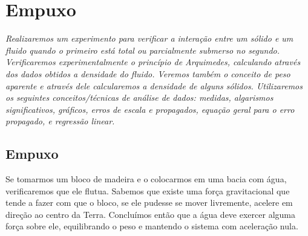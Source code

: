 \chapter{Empuxo} %
\label{Chap:ExpEmpuxo}        %

\begin{fullwidth}\it
	Realizaremos um experimento para verificar a interação entre um sólido e um fluido quando o primeiro está total ou parcialmente submerso no segundo. Verificaremos experimentalmente o princípio de Arquimedes, calculando através dos dados obtidos a densidade do fluido. Veremos também o conceito de peso aparente e através dele calcularemos a densidade de alguns sólidos. Utilizaremos os seguintes conceitos/técnicas de análise de dados: medidas, algarismos significativos, gráficos, erros de escala e propagados, equação geral para o erro propagado, e regressão linear.
\end{fullwidth}

\section{Empuxo}

Se tomarmos um bloco de madeira e o colocarmos em uma bacia com água, verificaremos que ele flutua. Sabemos que existe uma força gravitacional que tende a fazer com que o bloco, se ele pudesse se mover livremente, acelere em direção ao centro da Terra. Concluímos então que a água deve exercer alguma força sobre ele, equilibrando o peso e mantendo o sistema com aceleração nula.

